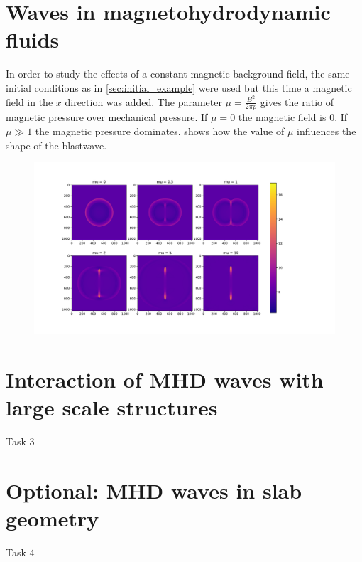 \documentclass[11pt]{article}
\begin{document}
\section{Waves in magnetohydrodynamic fluids} \label{sec:waves_in_magnetorhydrodynamic_fluids}
In order to study the effects of a constant magnetic background field, the same initial conditions as in \cref{sec:initial_example} were used but this time a magnetic field in the $x$ direction was added.
The parameter $\mu = \frac{B^2}{2\pi p}$ gives the ratio of magnetic pressure over mechanical pressure. If $\mu = 0$ the magnetic field is $0$. If $\mu \gg 1$ the magnetic pressure dominates.  shows how the value of $\mu$ influences the shape of the blastwave.
\begin{figure}[h]
	\centering
	\includegraphics[width = \linewidth]{figures/influence_mu.pdf}
	\caption{}
\label{fig:blastwave_shape_mu}
\end{figure}
\section{Interaction of MHD waves with large scale structures}
Task 3
\section{Optional: MHD waves in slab geometry}
Task 4
\printbibliography
\end{document}
